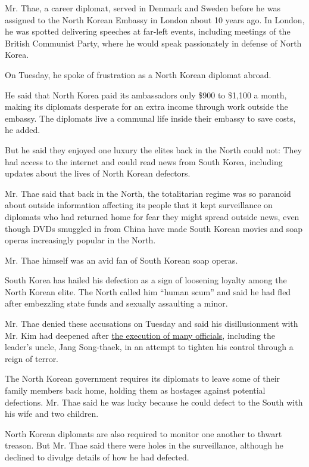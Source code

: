 Mr. Thae, a career diplomat, served in Denmark and Sweden before he was
assigned to the North Korean Embassy in London about 10 years ago. In
London, he was spotted delivering speeches at far-left events, including
meetings of the British Communist Party, where he would speak
passionately in defense of North Korea.

On Tuesday, he spoke of frustration as a North Korean diplomat abroad.

He said that North Korea paid its ambassadors only \$900 to \$1,100 a
month, making its diplomats desperate for an extra income through work
outside the embassy. The diplomats live a communal life inside their
embassy to save costs, he added.

But he said they enjoyed one luxury the elites back in the North could
not: They had access to the internet and could read news from South
Korea, including updates about the lives of North Korean defectors.

Mr. Thae said that back in the North, the totalitarian regime was so
paranoid about outside information affecting its people that it kept
surveillance on diplomats who had returned home for fear they might
spread outside news, even though DVDs smuggled in from China have made
South Korean movies and soap operas increasingly popular in the North.

Mr. Thae himself was an avid fan of South Korean soap operas.

South Korea has hailed his defection as a sign of loosening loyalty
among the North Korean elite. The North called him ``human scum'' and
said he had fled after embezzling state funds and sexually assaulting a
minor.

Mr. Thae denied these accusations on Tuesday and said his
disillusionment with Mr. Kim had deepened after
\href{http://www.nytimes.com/2013/12/14/world/asia/execution-raises-doubts-about-kims-grip-on-north-korea.html}{the
execution of many officials}, including the leader's uncle, Jang
Song-thaek, in an attempt to tighten his control through a reign of
terror.

The North Korean government requires its diplomats to leave some of
their family members back home, holding them as hostages against
potential defections. Mr. Thae said he was lucky because he could defect
to the South with his wife and two children.

North Korean diplomats are also required to monitor one another to
thwart treason. But Mr. Thae said there were holes in the surveillance,
although he declined to divulge details of how he had defected.

